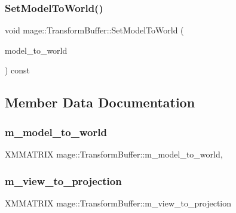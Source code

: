 \subsubsection{\texorpdfstring{Set\+Model\+To\+World()}{SetModelToWorld()}}
{\footnotesize\ttfamily void mage\+::\+Transform\+Buffer\+::\+Set\+Model\+To\+World (\begin{DoxyParamCaption}\item[{const X\+M\+M\+A\+T\+R\+IX \&}]{model\+\_\+to\+\_\+world }\end{DoxyParamCaption}) const}



\subsection{Member Data Documentation}
\hypertarget{structmage_1_1_transform_buffer_ac5f95a7f0e9ac61140c3520675da8e52}{}\label{structmage_1_1_transform_buffer_ac5f95a7f0e9ac61140c3520675da8e52} 
\subsubsection{\texorpdfstring{m\+\_\+model\+\_\+to\+\_\+world}{m\_model\_to\_world}}
{\footnotesize\ttfamily X\+M\+M\+A\+T\+R\+IX mage\+::\+Transform\+Buffer\+::m\+\_\+model\+\_\+to\+\_\+world\hspace{0.3cm}{\ttfamily [mutable]}, {\ttfamily [private]}}

\hypertarget{structmage_1_1_transform_buffer_a4f077fa865fe8edf41619f5941ee605c}{}\label{structmage_1_1_transform_buffer_a4f077fa865fe8edf41619f5941ee605c} 
\subsubsection{\texorpdfstring{m\+\_\+view\+\_\+to\+\_\+projection}{m\_view\_to\_projection}}
{\footnotesize\ttfamily X\+M\+M\+A\+T\+R\+IX mage\+::\+Transform\+Buffer\+::m\+\_\+view\+\_\+to\+\_\+projection\hspace{0.3cm}{\ttfamily [private]}}

